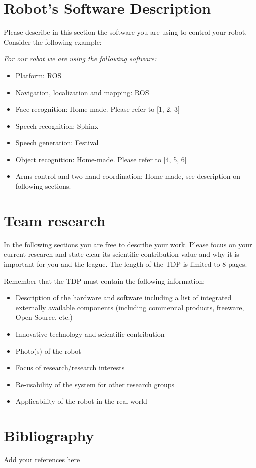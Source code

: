 \documentclass[runningheads,a4paper]{llncs}
\begin{document}
\section{Robot's Software Description}
Please describe in this section the software you are using to control your robot.
Consider the following example:

\textit{For our robot we are using the following software:}

\begin{itemize}
	\item Platform: ROS
	\item Navigation, localization and mapping: ROS
	\item Face recognition: Home-made. Please refer to [1, 2, 3]
	\item Speech recognition: Sphinx
	\item Speech generation: Festival
	\item Object recognition: Home-made. Please refer to [4, 5, 6]
	\item Arms control and two-hand coordination: Home-made, see description on following sections.
\end{itemize}

\section*{Team research}
In the following sections you are free to describe your work. Please focus on your current research and state clear its scientific contribution value and why it is important for you and the league. The length of the TDP is limited to 8 pages.

Remember that the TDP must contain the following information:

\begin{itemize}
	\item Description of the hardware and software including a list of integrated externally available components (including commercial products, freeware, Open Source, etc.)
	\item Innovative technology and scientific contribution
	\item Photo(s) of the robot
	\item Focus of research/research interests
	\item Re-usability of the system for other research groups
	\item Applicability of the robot in the real world
\end{itemize}

\section*{Bibliography}
Add your references here
%
%
\end{document}
